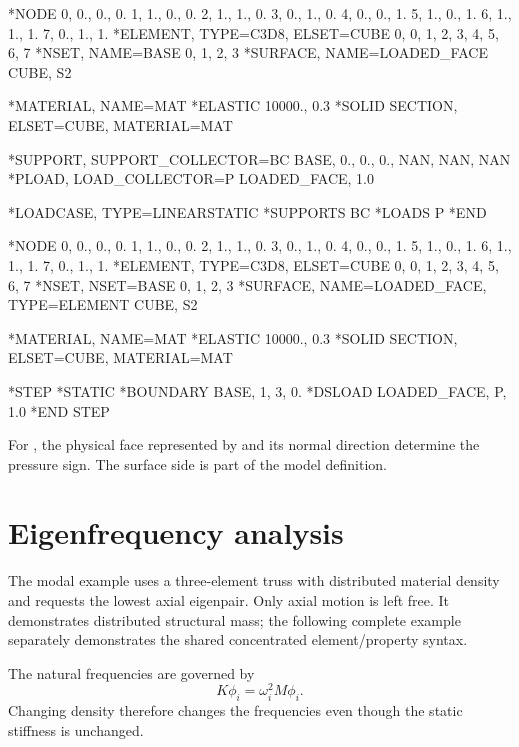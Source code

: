 \begin{dialectexamples}
\begin{femasterdeck}
*NODE
0, 0., 0., 0.
1, 1., 0., 0.
2, 1., 1., 0.
3, 0., 1., 0.
4, 0., 0., 1.
5, 1., 0., 1.
6, 1., 1., 1.
7, 0., 1., 1.
*ELEMENT, TYPE=C3D8, ELSET=CUBE
0, 0, 1, 2, 3, 4, 5, 6, 7
*NSET, NAME=BASE
0, 1, 2, 3
*SURFACE, NAME=LOADED_FACE
CUBE, S2

*MATERIAL, NAME=MAT
*ELASTIC
10000., 0.3
*SOLID SECTION, ELSET=CUBE, MATERIAL=MAT

*SUPPORT, SUPPORT_COLLECTOR=BC
BASE, 0., 0., 0., NAN, NAN, NAN
*PLOAD, LOAD_COLLECTOR=P
LOADED_FACE, 1.0

*LOADCASE, TYPE=LINEARSTATIC
*SUPPORTS
BC
*LOADS
P
*END
\end{femasterdeck}
\begin{abaqusdeck}
*NODE
0, 0., 0., 0.
1, 1., 0., 0.
2, 1., 1., 0.
3, 0., 1., 0.
4, 0., 0., 1.
5, 1., 0., 1.
6, 1., 1., 1.
7, 0., 1., 1.
*ELEMENT, TYPE=C3D8, ELSET=CUBE
0, 0, 1, 2, 3, 4, 5, 6, 7
*NSET, NSET=BASE
0, 1, 2, 3
*SURFACE, NAME=LOADED_FACE,
 TYPE=ELEMENT
CUBE, S2

*MATERIAL, NAME=MAT
*ELASTIC
10000., 0.3
*SOLID SECTION, ELSET=CUBE, MATERIAL=MAT

*STEP
*STATIC
*BOUNDARY
BASE, 1, 3, 0.
*DSLOAD
LOADED_FACE, P, 1.0
*END STEP
\end{abaqusdeck}
\end{dialectexamples}

For , the physical face represented by  and its normal direction determine the pressure sign. The surface side is part of the model definition.

\section{Eigenfrequency analysis}

The modal example uses a three-element truss with distributed material density and requests the lowest axial eigenpair. Only axial motion is left free. It demonstrates distributed structural mass; the following complete example separately demonstrates the shared concentrated  element/property syntax.

The natural frequencies are governed by
\[
K\phi_i=\omega_i^2M\phi_i.
\]
Changing density therefore changes the frequencies even though the static stiffness is unchanged.

